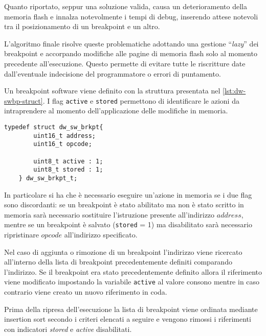 Quanto riportato, seppur una soluzione valida, causa un deterioramento della memoria flash e innalza notevolmente i tempi di debug, inserendo attese notevoli tra il posizionamento di un breakpoint e un altro.

L'algoritmo finale risolve queste problematiche adottando una gestione ``\textit{lazy}'' dei breakpoint e accorpando modifiche alle pagine di memoria flash solo al momento precedente all'esecuzione.
Questo permette di evitare tutte le riscritture date dall'eventuale indecisione del programmatore o errori di puntamento.

Un breakpoint software viene definito con la struttura presentata nel \cref{lst:dw-swbp-struct}. I flag \texttt{active} e \texttt{stored} permettono di identificare le azioni da intraprendere al momento dell'applicazione delle modifiche in memoria.

\noindent\begin{minipage}{\textwidth}
    \begin{lstlisting}[style=C, caption={Struttura utilizzata per il salvataggio dei riferimenti ai breakpoint software}, label=lst:dw-swbp-struct]
    typedef struct dw_sw_brkpt{
        uint16_t address;
        uint16_t opcode;

        uint8_t active : 1;
        uint8_t stored : 1;
    } dw_sw_brkpt_t;
    \end{lstlisting}
\end{minipage}

In particolare si ha che è necessario eseguire un'azione in memoria se i due flag sono discordanti: se un breakpoint è stato abilitato ma non è stato scritto in memoria sarà necessario sostituire l'istruzione presente all'indirizzo \(address\), mentre se un breakpoint è salvato (\texttt{stored} = 1) ma disabilitato sarà necessario ripristinare \(opcode\) all'indirizzo specificato.

Nel caso di aggiunta o rimozione di un breakpoint l'indirizzo viene ricercato all'interno della lista di breakpoint precedentemente definiti comparando l'indirizzo. Se il breakpoint era stato precedentemente definito allora il riferimento viene modificato impostando la variabile \texttt{active} al valore consono mentre in caso contrario viene creato un nuovo riferimento in coda.

Prima della ripresa dell'esecuzione la lista di breakpoint viene ordinata mediante insertion sort secondo i criteri elencati a seguire e vengono rimossi i riferimenti con indicatori \textit{stored} e \textit{active} disabilitati.

